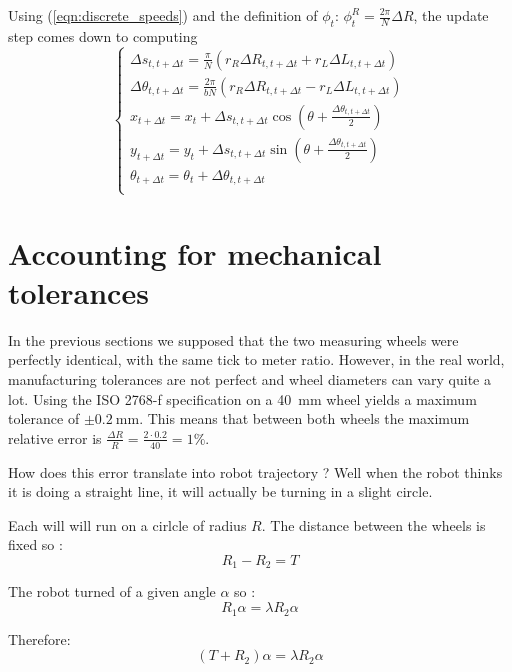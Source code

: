 \documentclass[a4paper, 10pt]{article}
\begin{document}
Using (\ref{eqn:discrete_speeds}) and the definition of $\phi_t$: $\phi_t^R = \frac{2\pi}{N} \Delta R$, the update step comes down to computing
\begin{equation}
\left\{
\begin{array}{lcl}
    \Delta s_{t,t+\Delta t} = \frac{\pi}{N} (r_R \Delta R_{t,t+\Delta t} + r_L \Delta L_{t,t+\Delta t}) \\
    \Delta \theta_{t,t+\Delta t}  = \frac{2\pi}{bN} (r_R \Delta R_{t,t+\Delta t} - r_L \Delta L_{t,t+\Delta t}) \\
    x_{t+\Delta t} = x_t + \Delta s_{t,t+\Delta t} \cos(\theta + \frac{\Delta \theta_{t,t+\Delta t}}{2}) \\
    y_{t+\Delta t} = y_t + \Delta s_{t,t+\Delta t} \sin(\theta + \frac{\Delta \theta_{t,t+\Delta t}}{2}) \\
    \theta_{t+\Delta t}  = \theta_t + \Delta \theta_{t,t+\Delta t} \\
\end{array}
\right.
\end{equation}


\section{Accounting for mechanical tolerances}
In the previous sections we supposed that the two measuring wheels were perfectly identical, with the same tick to meter ratio.
However, in the real world, manufacturing tolerances are not perfect and wheel diameters can vary quite a lot.
Using the ISO 2768-f specification on a \SI{40}{\milli\meter} wheel yields a maximum tolerance of $\pm \SI{0.2}{\milli\meter}$.
This means that between both wheels the maximum relative error is $\frac{\Delta R}{R} = \frac{2 \cdot 0.2}{40} = 1\% $.

How does this error translate into robot trajectory ?
Well when the robot thinks it is doing a straight line, it will actually be turning in a slight circle.

Each will will run on a cirlcle of radius $R$.
The distance between the wheels is fixed so :
\begin{equation*}
    R_1 - R_2 = T
\end{equation*}

The robot turned of a given angle $\alpha$ so :
\begin{equation*}
    R_1 \alpha = \lambda R_2 \alpha
\end{equation*}

Therefore:
\begin{equation*}
    (T + R_2) \alpha = \lambda R_2 \alpha
\end{equation*}
\end{document}
